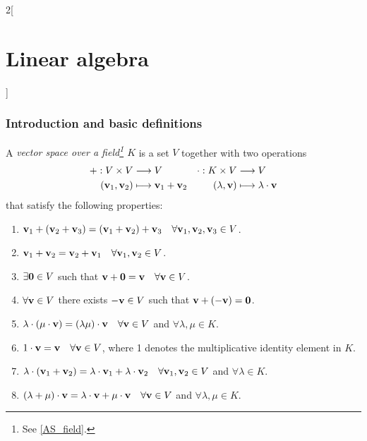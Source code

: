 \documentclass[../../../main.tex]{subfiles}
\begin{document}
\begin{multicols}{2}[\section{Linear algebra}]
  \subsubsection{Introduction and basic definitions}
  \begin{definition}
    A \textit{vector space over a field\footnote{See \cref{AS_field}.} $K$} is a set $V$ together with two operations
    \begin{align*}
      +:V\times V                                 & \longrightarrow V                                      & \cdot:K\times V              & \longrightarrow V                           \\
      (\boldsymbol{\mathrm{v}}_1,\boldsymbol{\mathrm{v}}_2) & \longmapsto \boldsymbol{\mathrm{v}}_1+ \boldsymbol{\mathrm{v}}_2 & (\lambda,\boldsymbol{\mathrm{v}}) & \longmapsto \lambda\cdot \boldsymbol{\mathrm{v}}
    \end{align*}
    that satisfy the following properties:
    \begin{enumerate}
      \item $\boldsymbol{\mathrm{v}}_1+(\boldsymbol{\mathrm{v}}_2+\boldsymbol{\mathrm{v}}_3)=(\boldsymbol{\mathrm{v}}_1+\boldsymbol{\mathrm{v}}_2)+\boldsymbol{\mathrm{v}}_3\quad\forall\boldsymbol{\mathrm{v}}_1,\boldsymbol{\mathrm{v}}_2,\boldsymbol{\mathrm{v}}_3\in V$.
      \item $\boldsymbol{\mathrm{v}}_1+\boldsymbol{\mathrm{v}}_2=\boldsymbol{\mathrm{v}}_2+\boldsymbol{\mathrm{v}}_1\quad\forall\boldsymbol{\mathrm{v}}_1,\boldsymbol{\mathrm{v}}_2\in V$.
      \item $\exists\boldsymbol{\mathrm{0}}\in V$ such that $\boldsymbol{\mathrm{v}}+\boldsymbol{\mathrm{0}}=\boldsymbol{\mathrm{v}}\quad\forall\boldsymbol{\mathrm{v}}\in V$.
      \item $\forall\boldsymbol{\mathrm{v}}\in V$ there exists $-\boldsymbol{\mathrm{v}}\in V$ such that $\boldsymbol{\mathrm{v}}+(-\boldsymbol{\mathrm{v}})=\boldsymbol{\mathrm{0}}$.
      \item $\lambda\cdot(\mu\cdot\boldsymbol{\mathrm{v}})=(\lambda\mu)\cdot\boldsymbol{\mathrm{v}}\quad\forall\boldsymbol{\mathrm{v}}\in V$ and $\forall\lambda,\mu\in K$.
      \item $1\cdot\boldsymbol{\mathrm{v}}=\boldsymbol{\mathrm{v}}\quad\forall\boldsymbol{\mathrm{v}}\in V$, where 1 denotes the multiplicative identity element in $K$.
      \item $\lambda\cdot(\boldsymbol{\mathrm{v}}_1+\boldsymbol{\mathrm{v}}_2)=\lambda\cdot\boldsymbol{\mathrm{v}}_1+\lambda\cdot\boldsymbol{\mathrm{v}}_2\quad\forall\boldsymbol{\mathrm{v}}_1,\boldsymbol{\mathrm{v}}_2\in V$ and $\forall\lambda\in K$.
      \item $(\lambda+\mu)\cdot\boldsymbol{\mathrm{v}}=\lambda\cdot\boldsymbol{\mathrm{v}}+\mu\cdot\boldsymbol{\mathrm{v}}\quad\forall\boldsymbol{\mathrm{v}}\in V$ and $\forall\lambda,\mu\in K$.

\end{enumerate}
\end{definition}
\end{multicols}
\end{document}
